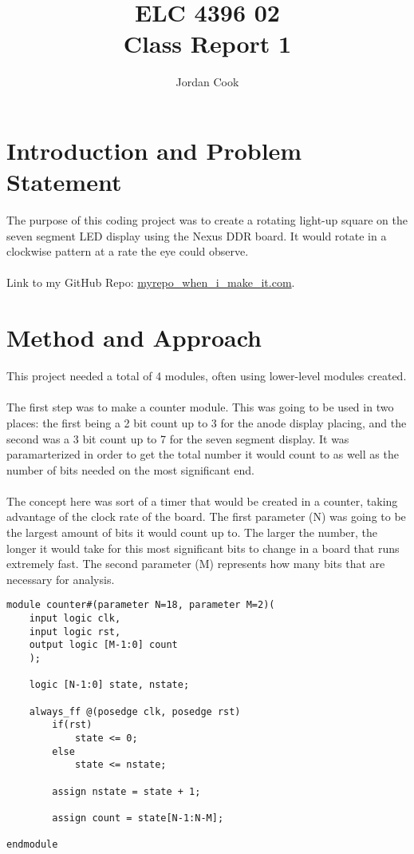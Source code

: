 \documentclass[11pt]{article}
\begin{document}
\title{ELC 4396 02 \\ Class Report 1}
\author{Jordan Cook}

\maketitle


\section*{Introduction and Problem Statement} 

The purpose of this coding project was to create a rotating light-up square on the seven segment LED display using the Nexus DDR board. It would rotate in a clockwise pattern at a rate the eye could observe. 
\\\\ Link to my GitHub Repo: \url{myrepo_when_i_make_it.com}.

\section*{Method and Approach}

This project needed a total of 4 modules, often using lower-level modules created. 
\\\\
The first step was to make a counter module. This was going to be used in two places: the first being a 2 bit count up to 3 for the anode display placing, and the second was a 3 bit count up to 7 for the seven segment display. It was paramarterized in order to get the total number it would count to as well as the number of bits needed on the most significant end. \\\\ The concept here was sort of a timer that would be created in a counter, taking advantage of the clock rate of the board. The first parameter (N) was going to be the largest amount of bits it would count up to. The larger the number, the longer it would take for this most significant bits to change in a board that runs extremely fast. The second parameter (M) represents how many bits that are necessary for analysis.

\begin{lstlisting}[style=Verilog,caption=Counter Module Code,label=code:ex ]
module counter#(parameter N=18, parameter M=2)(
	input logic clk,
	input logic rst,
	output logic [M-1:0] count
	);

	logic [N-1:0] state, nstate; 
	
	always_ff @(posedge clk, posedge rst) 
		if(rst)
			state <= 0; 
		else 
			state <= nstate; 
		
		assign nstate = state + 1; 
		
		assign count = state[N-1:N-M];         

endmodule
\end{lstlisting}
\end{document}
